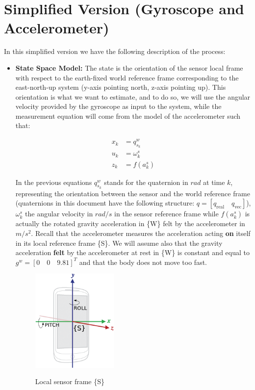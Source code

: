 \documentclass[a4paper,10pt]{article}
\begin{document}
\section{Simplified Version (Gyroscope and Accelerometer)}
In this simplified version we have the following description of the process:
\begin{itemize}
 \item \textbf{State Space Model:} The state is the orientation of the sensor local frame  with respect to the earth-fixed world reference frame  corresponding to the east-north-up system (y-axis pointing north, z-axis pointing up). This orientation is what we want to estimate, and to do so, we will use the angular velocity provided by the gyroscope as input to the system, while the measurement equation will come from the model of the accelerometer such that:

\begin{align}
 x_k &= q^w_{s_k} \\
 u_k &= \omega^s_k \\
 z_k &= f(a^s_{k})
\end{align}

In the previous equations $q^w_{s_k}$ stands for the quaternion in $rad$ at time $k$, representing the orientation between the sensor and the world reference frame (quaternions in this document have the following structure: $q = [q_{\text{real}} \quad q_{\text{vec}}]$), $\omega^s_k$ the angular velocity in $rad/s$ in the sensor reference frame while $f(a^s_{k})$ is actually the rotated gravity acceleration in \{W\} felt by the accelerometer in $m/s^2$. Recall that the accelerometer measures the acceleration acting \textbf{on} itself in its local reference frame \{S\}. We will assume also that the gravity acceleration \textbf{felt} by the accelerometer at rest in \{W\} is constant and equal to $g^w = [0 \quad 0 \quad 9.81]^T$ and that the body does not move too fast. 

\begin{figure}[h]
 \centering
 \includegraphics[width=0.4\textwidth]{./fig/axis_device.png}
 \label{fig:phone_frame}
 \caption{Local sensor frame \{S\}}
\end{figure}



\end{itemize}
\end{document}
